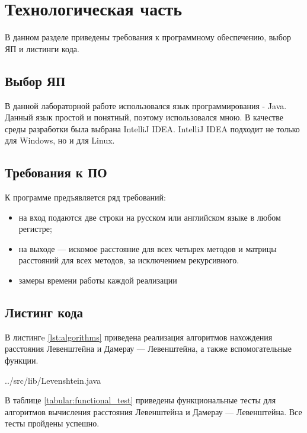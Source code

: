 \chapter{Технологическая часть}

В данном разделе приведены требования к программному обеспечению, выбор ЯП и листинги кода.

\section{Выбор ЯП}
В данной лабораторной работе использовался язык программирования - Java. Данный язык простой и понятный, поэтому использовался мною. В качестве среды разработки была выбрана IntelliJ IDEA. IntelliJ IDEA подходит не только для Windows, но и для Linux.

\section{Требования к ПО}

К программе предъявляется ряд требований:
\begin{itemize}
	\item на вход подаются две строки на русском или английском языке в любом регистре;
	\item на выходе — искомое расстояние для всех четырех методов и матрицы расстояний для всех методов, за исключением рекурсивного.
	\item замеры времени работы каждой реализации
\end{itemize}


\section{Листинг кода}

В листингe \ref{lst:algorithms} приведена реализация алгоритмов нахождения расстояния Левенштейна и Дамерау — Левенштейна, а также вспомогательные функции.

\begin{lstinputlisting}[
	caption={Листинг с алгоритмами},
	label={lst:algorithms},
    style={Java}
]{../src/lib/Levenshtein.java}
\end{lstinputlisting}
\clearpage

В таблице \ref{tabular:functional_test} приведены функциональные тесты для алгоритмов вычисления расстояния Левенштейна и Дамерау — Левенштейна. Все тесты пройдены успешно.

